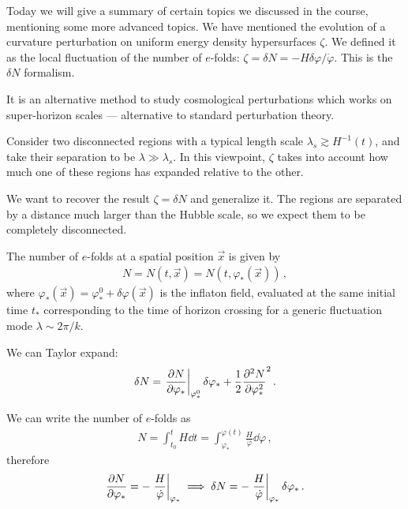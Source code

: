 \documentclass[main.tex]{subfiles}
\begin{document}

Today we will give a summary of certain topics we discussed in the course, mentioning some more advanced topics.
We have mentioned the evolution of a curvature perturbation on uniform energy density hypersurfaces \(\zeta \).
We defined it as the local fluctuation of the number of \(e\)-folds: \(\zeta = \delta N = - H \delta \varphi / \dot{\varphi}\). 
This is the \(\delta N\) formalism. 

It is an alternative method to study cosmological perturbations which works on super-horizon scales --- alternative to standard perturbation theory. 

Consider two disconnected regions with a typical length scale \(\lambda _s \gtrsim H^{-1}(t)\), and take their separation to be \(\lambda \gg \lambda _s\). 
In this viewpoint, \(\zeta \) takes into account how much one of these regions has expanded relative to the other.

We want to recover the result \(\zeta = \delta N\) and generalize it. 
The regions are separated by a distance much larger than the Hubble scale, so we expect them to be completely disconnected. 

The number of \(e\)-folds at a spatial position \(\vec{x}\) is given by 
%
\begin{align}
N = N(t, \vec{x}) = N(t, \varphi_*(\vec{x}))
\,,
\end{align}
%
where \(\varphi_* (\vec{x}) = \varphi^{0}_{*} + \delta \varphi (\vec{x})\) is the inflaton field, evaluated at the same initial time \(t_*\) corresponding to the time of horizon crossing for a generic fluctuation mode \(\lambda \sim 2 \pi / k\). 


We can Taylor expand: 
%
\begin{align}
\delta N = \eval{\pdv{N}{\varphi _*}}_{\varphi_*^{0}} \delta \varphi _*
+ \frac{1}{2} \pdv[2]{N}{\varphi _*} (\delta \varphi _*)^2
\,.
\end{align}

We can write the number of \(e\)-folds as 
%
\begin{align}
N = \int_{t_0 }^{t} H \dd{t} 
= \int_{\varphi _*}^{\varphi (t)}  \frac{H}{\dot{\varphi}} \dd{\varphi }
\,,
\end{align}
%
therefore 
%
\begin{align}
\pdv{N}{\varphi _*} = - \eval{\frac{H}{\dot{\varphi}}}_{\varphi _*} 
\implies
\delta N = - \eval{\frac{H}{\dot{\varphi}}}_{\varphi _*} \delta \varphi _*
\,.
\end{align}
\end{document}

